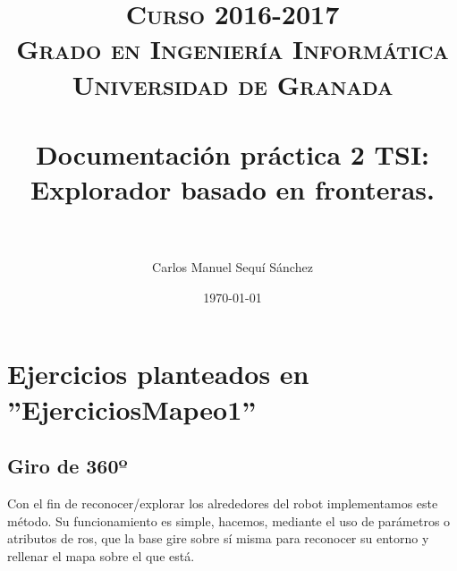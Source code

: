 


\title{	
\normalfont \normalsize 
\textsc{\textbf{Curso 2016-2017} \\ Grado en Ingeniería Informática \\ Universidad de Granada} \\ [25pt] %
\horrule{0.5pt} \\[0.4cm] %
\huge Documentación práctica 2 TSI: \\Explorador basado en fronteras. \\ %
\horrule{2pt} \\[0.5cm] %
}

\author{Carlos Manuel Sequí Sánchez} %

\date{\normalsize\today} %




\maketitle %

\newpage %

\tableofcontents %

\newpage




\section{Ejercicios planteados en ''EjerciciosMapeo1''}

\subsection{Giro de 360º}

Con el fin de reconocer/explorar los alrededores del robot implementamos este método. Su funcionamiento es simple, hacemos, mediante el uso de parámetros o atributos de ros, que la base gire sobre sí misma para reconocer su entorno y rellenar el mapa sobre el que está. \\

